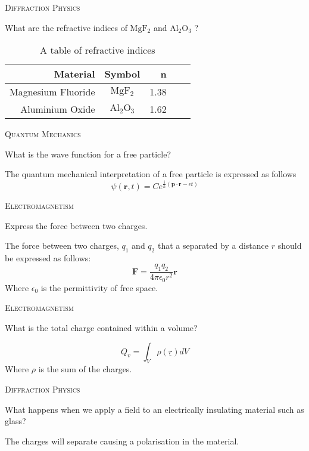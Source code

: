 \documentclass{article}
\newenvironment{flashcard}[2][]
  {\noindent\textsc{\Large#1}\par\vfill
   {\centering\Large#2\par}
   \vfill
   \newpage\Large\centering
  }
  {\newpage}
\begin{document}

\begin{flashcard}[Diffraction Physics]{What are the refractive indices of $\mathrm{Mg F_{2}}$ and $\mathrm{Al_{2}O_{3}}$ ?}

\begin{table}[htdp]
\caption{A table of refractive indices}
\begin{tabular}{| r | c | r | c | r |}
\hline
Material & Symbol & n  \\
\hline
Magnesium Fluoride & $\mathrm{Mg F_{2}}$ & 1.38 \\
Aluminium Oxide & $\mathrm{Al_{2}O_{3}}$ & 1.62 \\
\hline
\end{tabular}
\label{default}
\end{table}%
\end{flashcard}
\begin{flashcard}[Quantum Mechanics]{What is the wave function for a free particle?}
The quantum mechanical interpretation of a free particle is expressed as follows
$$\psi(\mathbf{r},t)=C e^{\frac{i}{\hbar}(\mathbf{p}\cdot \mathbf{r}-\epsilon t)}$$

\end{flashcard}


\begin{flashcard}[Electromagnetism]{Express the force between two charges.}
The force between two charges, $q_{1}$ and $q_{2}$ that a separated by a distance $r$ should be expressed as follows:
$$\mathbf{F}=\frac{q_{1} q_{2}}{4\pi \epsilon_{0} r^2} \mathbf{r} $$
Where $\epsilon_{0}$ is the permittivity of free space.

\end{flashcard}



\begin{flashcard}[Electromagnetism]{What is the total charge contained within a volume?}
$$Q_v=\int_{V}{\rho(\underline{r})dV}$$
Where $\rho$ is the sum of the charges.

\end{flashcard}



\begin{flashcard}[Diffraction Physics]{What happens when we apply a field to an electrically insulating material such as glass?}
The charges will separate causing a polarisation in the material.

\end{flashcard}

\end{document}
